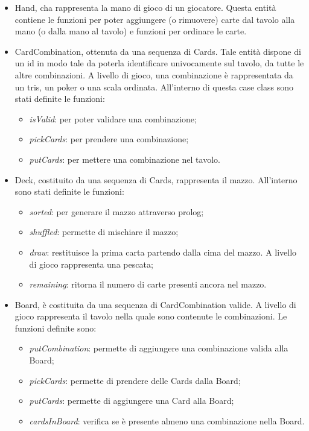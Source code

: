 \begin{itemize}
    \item Hand, cha rappresenta la mano di gioco di un giocatore. Questa entità contiene le funzioni per poter aggiungere (o rimuovere) carte dal tavolo alla mano (o dalla mano al tavolo) e funzioni per ordinare le carte.
    \item CardCombination, ottenuta da una sequenza di Cards. Tale entità dispone di un id in modo tale da poterla identificare univocamente sul tavolo, da tutte le altre combinazioni. A livello di gioco, una combinazione è rappresentata da un tris, un poker o una scala ordinata. All’interno di questa case class sono stati definite le funzioni:
    \begin{itemize}
        \item \textit{isValid}: per poter validare una combinazione;
        \item \textit{pickCards}: per prendere una combinazione;
        \item \textit{putCards}: per mettere una combinazione nel tavolo.
    \end{itemize}
    \item Deck, costituito da una sequenza di Cards, rappresenta il mazzo. All’interno sono stati definite le funzioni:
    \begin{itemize}
        \item \textit{sorted}: per generare il mazzo attraverso prolog;
        \item \textit{shuffled}: permette di mischiare il mazzo;
        \item \textit{draw}: restituisce la prima carta partendo dalla cima del mazzo. A livello di gioco rappresenta una pescata;
        \item \textit{remaining}: ritorna il numero di carte presenti ancora nel mazzo.
    \end{itemize}
    \item Board, è costituita da una sequenza di CardCombination valide. A livello di gioco rappresenta il tavolo nella quale sono contenute le combinazioni. Le funzioni definite sono:
    \begin{itemize}
        \item \textit{putCombination}: permette di aggiungere una combinazione valida alla Board;
        \item \textit{pickCards}: permette di prendere delle Cards dalla Board; 
        \item \textit{putCards}: permette di aggiungere una Card alla Board;
        \item \textit{cardsInBoard}: verifica se è presente almeno una combinazione nella Board.
    \end{itemize}
\end{itemize}
\newpage
